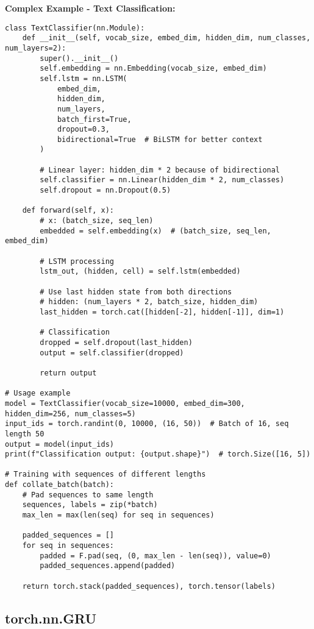 \documentclass[11pt,a4paper]{book}
\begin{document}
\textbf{Complex Example - Text Classification:}
\begin{verbatim}
class TextClassifier(nn.Module):
    def __init__(self, vocab_size, embed_dim, hidden_dim, num_classes, num_layers=2):
        super().__init__()
        self.embedding = nn.Embedding(vocab_size, embed_dim)
        self.lstm = nn.LSTM(
            embed_dim, 
            hidden_dim, 
            num_layers,
            batch_first=True,
            dropout=0.3,
            bidirectional=True  # BiLSTM for better context
        )
        
        # Linear layer: hidden_dim * 2 because of bidirectional
        self.classifier = nn.Linear(hidden_dim * 2, num_classes)
        self.dropout = nn.Dropout(0.5)
        
    def forward(self, x):
        # x: (batch_size, seq_len)
        embedded = self.embedding(x)  # (batch_size, seq_len, embed_dim)
        
        # LSTM processing
        lstm_out, (hidden, cell) = self.lstm(embedded)
        
        # Use last hidden state from both directions
        # hidden: (num_layers * 2, batch_size, hidden_dim)
        last_hidden = torch.cat([hidden[-2], hidden[-1]], dim=1)
        
        # Classification
        dropped = self.dropout(last_hidden)
        output = self.classifier(dropped)
        
        return output

# Usage example
model = TextClassifier(vocab_size=10000, embed_dim=300, hidden_dim=256, num_classes=5)
input_ids = torch.randint(0, 10000, (16, 50))  # Batch of 16, seq length 50
output = model(input_ids)
print(f"Classification output: {output.shape}")  # torch.Size([16, 5])

# Training with sequences of different lengths
def collate_batch(batch):
    # Pad sequences to same length
    sequences, labels = zip(*batch)
    max_len = max(len(seq) for seq in sequences)
    
    padded_sequences = []
    for seq in sequences:
        padded = F.pad(seq, (0, max_len - len(seq)), value=0)
        padded_sequences.append(padded)
    
    return torch.stack(padded_sequences), torch.tensor(labels)
\end{verbatim}

\subsection{torch.nn.GRU}
\end{document}
